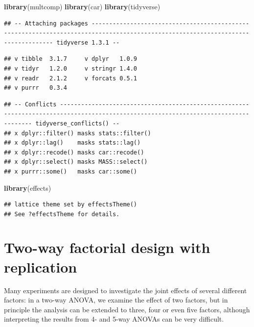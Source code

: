 \documentclass[
  12pt,
]{book}
\newenvironment{Shaded}{\begin{snugshade}}{\end{snugshade}}
\newcommand{\KeywordTok}[1]{\textcolor[rgb]{0.13,0.29,0.53}{\textbf{#1}}}
\newcommand{\NormalTok}[1]{#1}
\begin{document}
\begin{Shaded}
\begin{Highlighting}[]
\KeywordTok{library}\NormalTok{(multcomp)}
\KeywordTok{library}\NormalTok{(car)}
\KeywordTok{library}\NormalTok{(tidyverse)}
\end{Highlighting}
\end{Shaded}

\begin{verbatim}
## -- Attaching packages --------------------------------------------------------------------------------------------------------------------------------- tidyverse 1.3.1 --
\end{verbatim}

\begin{verbatim}
## v tibble  3.1.7     v dplyr   1.0.9
## v tidyr   1.2.0     v stringr 1.4.0
## v readr   2.1.2     v forcats 0.5.1
## v purrr   0.3.4
\end{verbatim}

\begin{verbatim}
## -- Conflicts ------------------------------------------------------------------------------------------------------------------------------------ tidyverse_conflicts() --
## x dplyr::filter() masks stats::filter()
## x dplyr::lag()    masks stats::lag()
## x dplyr::recode() masks car::recode()
## x dplyr::select() masks MASS::select()
## x purrr::some()   masks car::some()
\end{verbatim}

\begin{Shaded}
\begin{Highlighting}[]
\KeywordTok{library}\NormalTok{(effects)}
\end{Highlighting}
\end{Shaded}

\begin{verbatim}
## lattice theme set by effectsTheme()
## See ?effectsTheme for details.
\end{verbatim}

\hypertarget{two-way-factorial-design-with-replication}{%
\section{Two-way factorial design with replication}\label{two-way-factorial-design-with-replication}}

Many experiments are designed to investigate the joint effects of several different factors: in a two-way ANOVA, we examine the effect of two factors, but in principle the analysis can be extended to three, four or even five factors, although interpreting the results from 4- and 5-way ANOVAs can be very difficult.
\end{document}
